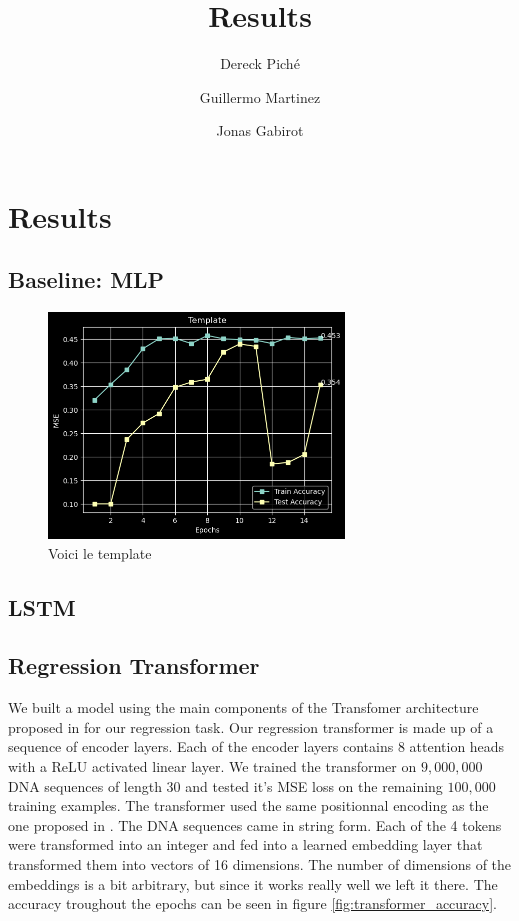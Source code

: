 \documentclass{article}
\title{Results}
\author
{
    Dereck Piché \and
    Guillermo Martinez \and
    Jonas Gabirot \and
}
\begin{document}
\maketitle

\section{Results}


\subsection{Baseline: MLP}

\begin{figure} \label{fig:template}
    \caption{Voici le template} \center
    \includegraphics[width=0.7\textwidth]{images/2023-03-28-10-29-38.png}
\end{figure}

\subsection{LSTM}

\subsection{Regression Transformer}
We built a model using the main components of the Transfomer architecture proposed in \cite{transformers} for our regression task. Our regression transformer is made up of a sequence of encoder layers. Each of the encoder layers contains 8 attention heads with a ReLU activated linear layer. We trained the transformer on $9 ,000, 000$ DNA sequences of length $30$ and tested it's MSE loss on the remaining $100,000$ training examples. The transformer used the same positionnal encoding as the one proposed in \cite{transformers}. The DNA sequences came in string form. Each of the 4 tokens were transformed into an integer and fed into a learned embedding layer that transformed them into vectors of 16 dimensions. The number of dimensions of the embeddings is a bit arbitrary, but since it works really well we left it there. The accuracy troughout the epochs can be seen in figure \ref{fig:transformer_accuracy}. 
\end{document}
